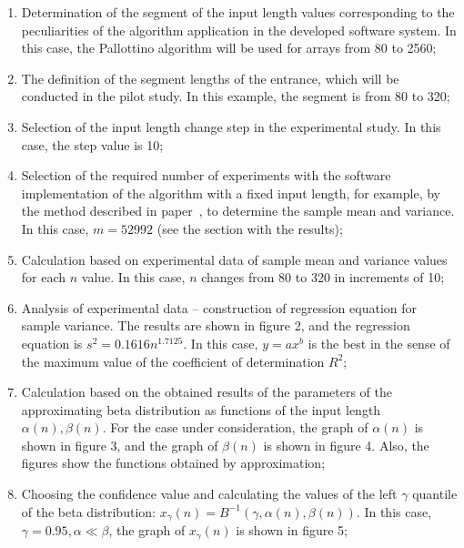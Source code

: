 \documentclass[a4paper]{article}
\begin{document}
\begin{enumerate}
	\item Determination of the segment of the input length values corresponding to the peculiarities of the algorithm application in the developed software system. In this case, the Pallottino algorithm will be used for arrays from 80 to 2560;
	
	\item The definition of the segment lengths of the entrance, which will be conducted in the pilot study. In this example, the segment is from 80 to 320;
	
	\item Selection of the input length change step in the experimental study. In this case, the step value is 10;
	
	\item Selection of the required number of experiments with the software implementation of the algorithm with a fixed input length, for example, by the method described in paper~\cite{petrushyn_ulyanov_planning}, to determine the sample mean and variance. In this case, $m = 52992$ (see the section with the results);
	
	\item Calculation based on experimental data of sample mean and variance values for each $n$ value. In this case, $n$ changes from 80 to 320 in increments of 10;

	\item Analysis of experimental data – construction of regression equation for sample variance. The results are shown in figure 2, and the regression equation is $s^2 = 0.1616n^{1.7125}$. In this case, $y = ax^b$ is the best in the sense of the maximum value of the coefficient of determination $R^2$;
	
	\item Calculation based on the obtained results of the parameters of the approximating beta distribution as functions of the input length $\alpha(n), \beta(n)$. For the case under consideration, the graph of $\alpha(n)$ is shown in figure 3, and the graph of $\beta(n)$ is shown in figure 4. Also, the figures show the functions obtained by approximation;
	
	\item Choosing the confidence value and calculating the values of the left $\gamma$ quantile of the beta distribution: $x_\gamma(n) = B^{-1}(\gamma, \alpha(n), \beta(n))$. In this case, $\gamma = 0.95, \alpha \ll \beta$, the graph of $x_\gamma(n)$ is shown in figure 5;
	

\end{enumerate}
\end{document}
